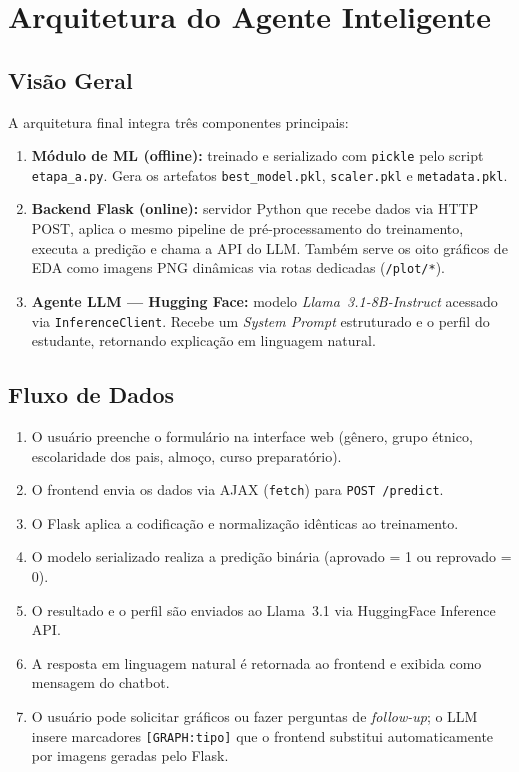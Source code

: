 \documentclass[12pt, a4paper]{article}
\begin{document}
\section{Arquitetura do Agente Inteligente}

\subsection{Visão Geral}

A arquitetura final integra três componentes principais:

\begin{enumerate}
  \item \textbf{Módulo de ML (offline):} treinado e serializado com
  \texttt{pickle} pelo script \texttt{etapa\_a.py}. Gera os artefatos
  \texttt{best\_model.pkl}, \texttt{scaler.pkl} e \texttt{metadata.pkl}.

  \item \textbf{Backend Flask (online):} servidor Python que recebe dados
  via HTTP POST, aplica o mesmo pipeline de pré-processamento do treinamento,
  executa a predição e chama a API do LLM. Também serve os oito gráficos de
  EDA como imagens PNG dinâmicas via rotas dedicadas (\texttt{/plot/*}).

  \item \textbf{Agente LLM --- Hugging Face:} modelo
  \textit{Llama~3.1-8B-Instruct} acessado via \texttt{InferenceClient}.
  Recebe um \textit{System Prompt} estruturado e o perfil do estudante,
  retornando explicação em linguagem natural.
\end{enumerate}

\subsection{Fluxo de Dados}

\begin{enumerate}
  \item O usuário preenche o formulário na interface web (gênero, grupo
  étnico, escolaridade dos pais, almoço, curso preparatório).
  \item O frontend envia os dados via AJAX (\texttt{fetch}) para
  \texttt{POST /predict}.
  \item O Flask aplica a codificação e normalização idênticas ao treinamento.
  \item O modelo serializado realiza a predição binária (aprovado = 1 ou
  reprovado = 0).
  \item O resultado e o perfil são enviados ao Llama~3.1 via HuggingFace
  Inference API.
  \item A resposta em linguagem natural é retornada ao frontend e exibida
  como mensagem do chatbot.
  \item O usuário pode solicitar gráficos ou fazer perguntas de
  \textit{follow-up}; o LLM insere marcadores \texttt{[GRAPH:tipo]} que o
  frontend substitui automaticamente por imagens geradas pelo Flask.
\end{enumerate}
\end{document}
